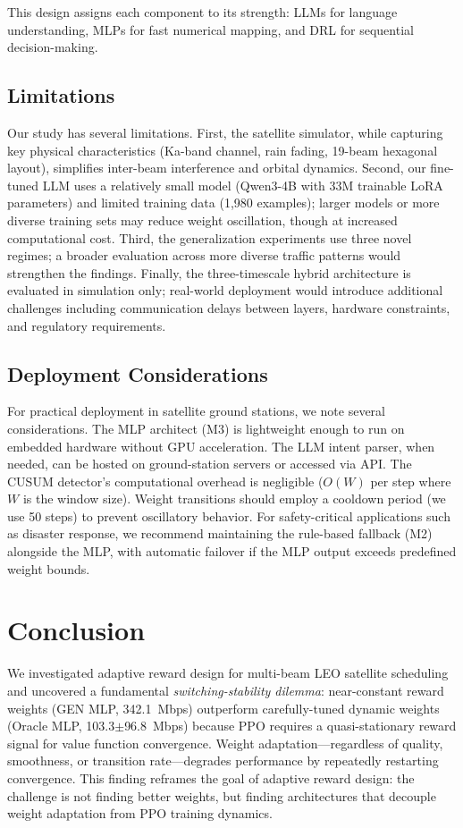 \documentclass[conference]{IEEEtran}
\begin{document}
This design assigns each component to its strength: LLMs for language understanding, MLPs for fast numerical mapping, and DRL for sequential decision-making.

\subsection{Limitations}
Our study has several limitations. First, the satellite simulator, while capturing key physical characteristics (Ka-band channel, rain fading, 19-beam hexagonal layout), simplifies inter-beam interference and orbital dynamics. Second, our fine-tuned LLM uses a relatively small model (Qwen3-4B with 33M trainable LoRA parameters) and limited training data (1,980 examples); larger models or more diverse training sets may reduce weight oscillation, though at increased computational cost. Third, the generalization experiments use three novel regimes; a broader evaluation across more diverse traffic patterns would strengthen the findings. Finally, the three-timescale hybrid architecture is evaluated in simulation only; real-world deployment would introduce additional challenges including communication delays between layers, hardware constraints, and regulatory requirements.

\subsection{Deployment Considerations}
For practical deployment in satellite ground stations, we note several considerations. The MLP architect (M3) is lightweight enough to run on embedded hardware without GPU acceleration. The LLM intent parser, when needed, can be hosted on ground-station servers or accessed via API. The CUSUM detector's computational overhead is negligible ($O(W)$ per step where $W$ is the window size). Weight transitions should employ a cooldown period (we use 50 steps) to prevent oscillatory behavior. For safety-critical applications such as disaster response, we recommend maintaining the rule-based fallback (M2) alongside the MLP, with automatic failover if the MLP output exceeds predefined weight bounds.

\section{Conclusion}

We investigated adaptive reward design for multi-beam LEO satellite scheduling and uncovered a fundamental \emph{switching-stability dilemma}: near-constant reward weights (GEN MLP, 342.1~Mbps) outperform carefully-tuned dynamic weights (Oracle MLP, 103.3$\pm$96.8~Mbps) because PPO requires a quasi-stationary reward signal for value function convergence. Weight adaptation---regardless of quality, smoothness, or transition rate---degrades performance by repeatedly restarting convergence. This finding reframes the goal of adaptive reward design: the challenge is not finding better weights, but finding architectures that decouple weight adaptation from PPO training dynamics.
\end{document}
